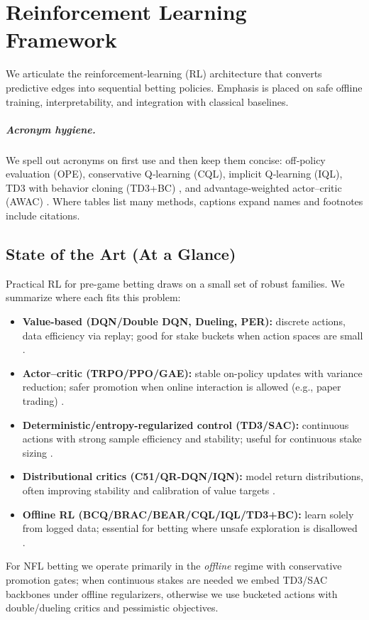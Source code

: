 \chapter{Reinforcement Learning Framework}
\label{chap:rl}

We articulate the reinforcement-learning (RL) architecture that converts predictive edges into sequential betting policies. Emphasis is placed on safe offline training, interpretability, and integration with classical baselines.

\paragraph{Acronym hygiene.} We spell out acronyms on first use and then keep them concise: off‑policy evaluation (OPE), conservative Q‑learning (CQL), implicit Q‑learning (IQL), TD3 with behavior cloning (TD3+BC) \citep{fujimoto2021td3bc}, and advantage‑weighted actor–critic (AWAC) \citep{nair2020awac}. Where tables list many methods, captions expand names and footnotes include citations.

\section{State of the Art (At a Glance)}
Practical RL for pre-game betting draws on a small set of robust families. We summarize where each fits this problem:
\begin{itemize}
  \item \textbf{Value-based (DQN/Double DQN, Dueling, PER):} discrete actions, data efficiency via replay; good for stake buckets when action spaces are small \citep{mnih2015,vanhasselt2016,wang2016dueling,schaul2016per}.
  \item \textbf{Actor--critic (TRPO/PPO/GAE):} stable on-policy updates with variance reduction; safer promotion when online interaction is allowed (e.g., paper trading) \citep{schulman2015trpo,schulman2016gae,schulman2017ppo}.
  \item \textbf{Deterministic/entropy-regularized control (TD3/SAC):} continuous actions with strong sample efficiency and stability; useful for continuous stake sizing \citep{fujimoto2018td3,haarnoja2018sac}.
  \item \textbf{Distributional critics (C51/QR-DQN/IQN):} model return distributions, often improving stability and calibration of value targets \citep{bellemare2017distributional,dabney2018quantile}.
  \item \textbf{Offline RL (BCQ/BRAC/BEAR/CQL/IQL/TD3+BC):} learn solely from logged data; essential for betting where unsafe exploration is disallowed \citep{fujimoto2019,wu2019brac,kumar2019bear,kumar2020,kostrikov2021iql,agarwal2020offline,levine2020}.
\end{itemize}
For NFL betting we operate primarily in the \emph{offline} regime with conservative promotion gates; when continuous stakes are needed we embed TD3/SAC backbones under offline regularizers, otherwise we use bucketed actions with double/dueling critics and pessimistic objectives.

